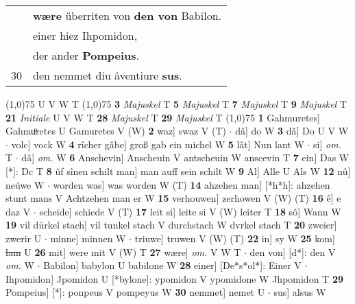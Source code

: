 \documentclass[8pt,a4paper,notitlepage]{article}
\begin{document}
\begin{table}[ht]
\begin{minipage}[t]{0.5\linewidth}
\begin{tabular}{rl}
 & \textbf{wære} überriten von \textbf{den von} Babilon.\\ 
 & einer hiez Ihpomidon,\\ 
 & der ander \textbf{Pompeius}.\\ 
30 & den nemmet diu âventiure \textbf{sus}.\\ 
\end{tabular}
\scriptsize
\line(1,0){75} \newline
U V W T \newline
\line(1,0){75} \newline
\textbf{3} \textit{Majuskel} T  \textbf{5} \textit{Majuskel} T  \textbf{7} \textit{Majuskel} T  \textbf{9} \textit{Majuskel} T  \textbf{21} \textit{Initiale} U V W T  \textbf{28} \textit{Majuskel} T  \textbf{29} \textit{Majuskel} T  \newline
\line(1,0){75} \newline
\textbf{1} Gahmuretes] Gahmuͦretes U Gamuretes V (W) \textbf{2} waz] swaz V (T)  $\cdot$ dâ] do W \textbf{3} dâ] Do U V W  $\cdot$ volc] vock W \textbf{4} rîcher gâbe] groß gab ein michel W \textbf{5} lât] Nun lant W  $\cdot$ si] \textit{om.} T  $\cdot$ dâ] \textit{om.} W \textbf{6} Anschevin] Anscheuin V antscheuin W anscevin T \textbf{7} ein] Das W [*]: Dc T \textbf{8} ûf sînen schilt man] man auff sein schilt W \textbf{9} Al] Alle U Als W \textbf{12} nû] neúwe W  $\cdot$ worden was] was worden W (T) \textbf{14} ahzehen man] [*h*h]: ahzehen stunt mans V Achtzehen man er W \textbf{15} verhouwen] zerhowen V (W) (T) \textbf{16} ê] e daz V  $\cdot$ scheide] schiede V (T) \textbf{17} leit si] leite si V (W) leiter T \textbf{18} sô] Wann W \textbf{19} vil dürkel stach] vil tunkel stach V durchstach W dvrkel stach T \textbf{20} zweier] zwerir U  $\cdot$ minne] minnen W  $\cdot$ triuwe] truwen V (W) (T) \textbf{22} in] sy W \textbf{25} kom] \sout{lam} U \textbf{26} mit] were mit V (W) T \textbf{27} wære] \textit{om.} V W T  $\cdot$ den von] [d*]: den V \textit{om.} W  $\cdot$ Babilon] babylon U babilone W \textbf{28} einer] [De*s*ol*]: Einer V  $\cdot$ Ihpomidon] Jpomidon U [*bylone]: ypomidon V ypomidone W Jhpomidon T \textbf{29} Pompeius] [*]: ponpeus V pompeyus W \textbf{30} nemmet] nemet U  $\cdot$ sus] alsus W \newline
\end{minipage}
\end{table}
\end{document}
